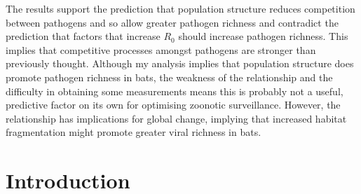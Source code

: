 The results support the prediction that population structure reduces competition between pathogens and so allow greater pathogen richness and
contradict the prediction that factors that increase $R_0$ should increase pathogen richness.
This implies that competitive processes amongst pathogens are stronger than previously thought.
%
%
Although my analysis implies that population structure does promote pathogen richness in bats, the weakness of the relationship and the difficulty in obtaining some measurements means this is probably not a useful, predictive factor on its own for optimising zoonotic surveillance.
However, the relationship has implications for global change, implying that increased habitat fragmentation might promote greater viral richness in bats.






\section{Introduction}



